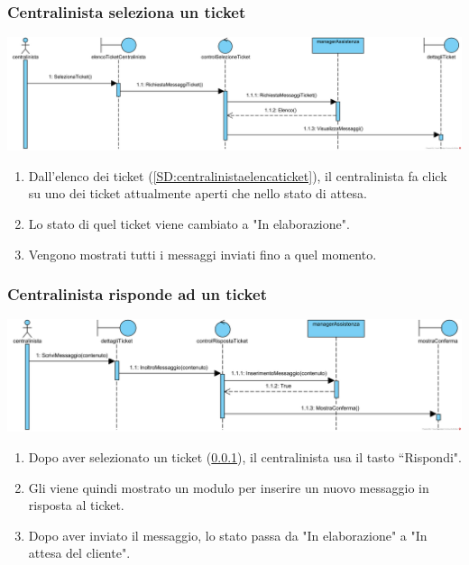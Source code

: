 \documentclass[12pt]{article}
\begin{document}
\subsubsection{Centralinista seleziona un ticket}
\label{SD:selezioneticketcentralinista}

\begin{center}
\includegraphics[width=\textwidth]{SequenceDiagram/CentralinistaTicketSeleziona}
\end{center}

\begin{enumerate}
\item Dall'elenco dei ticket (\ref{SD:centralinistaelencaticket}), il centralinista fa click su uno dei ticket attualmente aperti che nello stato di attesa.
\item Lo stato di quel ticket viene cambiato a "In elaborazione".
\item Vengono mostrati tutti i messaggi inviati fino a quel momento.
\end{enumerate}

\newpage

\subsubsection{Centralinista risponde ad un ticket}
\label{SD:rispostaticketcentralinista}

\begin{center}
\includegraphics[width=\textwidth]{SequenceDiagram/CentralinistaTicketRisponde}
\end{center}

\begin{enumerate}
\item Dopo aver selezionato un ticket (\ref{SD:selezioneticketcentralinista}), il centralinista usa il tasto ``Rispondi".
\item Gli viene quindi mostrato un modulo per inserire un nuovo messaggio in risposta al ticket.
\item Dopo aver inviato il messaggio, lo stato passa da "In elaborazione" a "In attesa del cliente".
\end{enumerate}
\end{document}
